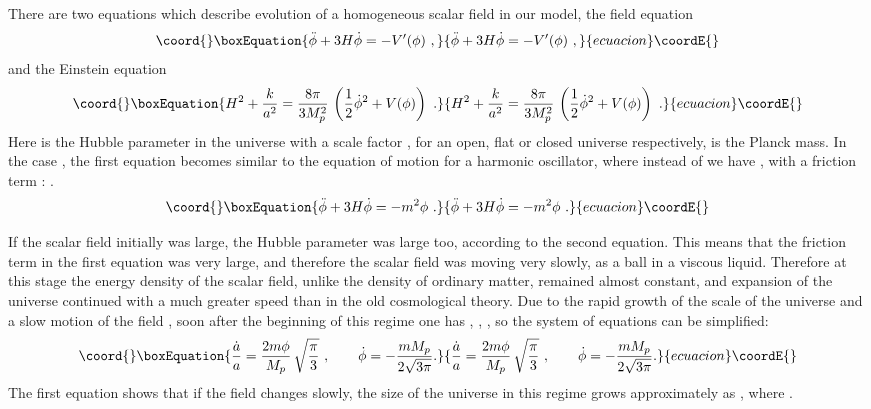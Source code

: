 \documentclass[a4paper,12pt]{article}
\begin{document}
There are  two equations which describe evolution of a homogeneous scalar
field
 in our model, the field equation
\begin{equation}\coord{}\boxEquation{\label{1}
 \ddot\phi + 3H\dot\phi = -{V'(\phi)} \ ,
}{\ddot\phi + 3H\dot\phi = -{V'(\phi)} \ ,
}{ecuacion}\coordE{}\end{equation}
and the Einstein equation
\begin{equation}\coord{}\boxEquation{\label{2}
H^2 +{k\over a^2} ={8\pi  \over 3 M_p^2}\, \left(  {1\over 2}\dot \phi
^2+V(\phi) \right) \ .
}{H^2 +{k\over a^2} ={8\pi  \over 3 M_p^2}\, \left(  {1\over 2}\dot \phi
^2+V(\phi) \right) \ .
}{ecuacion}\coordE{}\end{equation}
Here \coordHE{} is the Hubble parameter in the universe with a scale
factor \coordHE{}, \coordHE{} for an open, flat or closed universe
respectively, \coordHE{} is the Planck mass. In the case \coordHE{},
the first equation becomes similar to the
 equation of motion for a harmonic oscillator, where instead of \coordHE{} we have
\coordHE{},  with a friction term \coordHE{}:   .
\begin{equation}\coord{}\boxEquation{\label{1ax}
\ddot\phi + 3H\dot\phi = -m^2\phi  \ .
}{\ddot\phi + 3H\dot\phi = -m^2\phi  \ .
}{ecuacion}\coordE{}\end{equation}



 If   the scalar field \myHighlight{$\phi$}\coordHE{}  initially was large,   the Hubble parameter \coordHE{}
was large too, according to the second equation. This means that the
friction term in the first equation was very large, and therefore    the
scalar field was moving   very slowly, as a ball in a viscous liquid.
Therefore at this stage the energy density of the scalar field, unlike
the  density of ordinary matter,   remained almost constant, and
expansion of the universe continued with a much greater speed than in the
old cosmological theory. Due to the rapid growth of the scale of the
universe and a slow motion of the field \myHighlight{$\phi$}\coordHE{}, soon after the beginning
of this regime one has \coordHE{}, \coordHE{}, \coordHE{}, so  the system of equations can be
simplified:
\begin{equation}\coord{}\boxEquation{\label{E04}
{\dot a \over a}   ={2
m\phi\over M_p}\, \sqrt { \pi  \over 3}\ , ~~~~~~  \dot\phi = -{m M_p\over 2\sqrt{3\pi}}     .
}{{\dot a \over a}   ={2
m\phi\over M_p}\, \sqrt { \pi  \over 3}\ , ~~~~~~  \dot\phi = -{m M_p\over 2\sqrt{3\pi}}     .
}{ecuacion}\coordE{}\end{equation}
The first equation shows that if the field \myHighlight{$\phi$}\coordHE{} changes slowly, the size of the universe in this regime
grows approximately as \coordHE{}, where \coordHE{}. 
\end{document}

